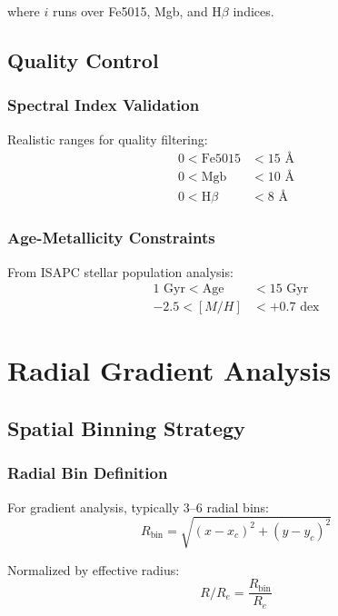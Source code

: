 \documentclass[12pt,a4paper]{article}
\newcommand{\RRe}{R/R_e}
\begin{document}
where $i$ runs over Fe5015, Mgb, and H$\beta$ indices.

\subsection{Quality Control}

\subsubsection{Spectral Index Validation}
Realistic ranges for quality filtering:
\begin{align}
0 < \text{Fe5015} &< 15 \text{ \AA} \\
0 < \text{Mgb} &< 10 \text{ \AA} \\
0 < \text{H}\beta &< 8 \text{ \AA}
\end{align}

\subsubsection{Age-Metallicity Constraints}
From ISAPC stellar population analysis:
\begin{align}
1 \text{ Gyr} < \text{Age} &< 15 \text{ Gyr} \\
-2.5 < [M/H] &< +0.7 \text{ dex}
\end{align}

\section{Radial Gradient Analysis}

\subsection{Spatial Binning Strategy}

\subsubsection{Radial Bin Definition}
For gradient analysis, typically 3--6 radial bins:
\begin{equation}
R_{\text{bin}} = \sqrt{(x - x_c)^2 + (y - y_c)^2}
\end{equation}

Normalized by effective radius:
\begin{equation}
\RRe = \frac{R_{\text{bin}}}{R_e}
\end{equation}
\end{document}
